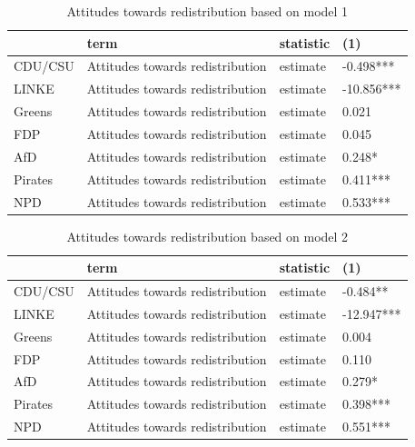 \documentclass[
]{article}
\begin{document}
\begin{table}

\caption{\label{tab:multinomial-model}Attitudes towards redistribution based on model 1}
\centering
\begin{tabu} to 
\toprule
  & term & statistic & (1)\\
\midrule
CDU/CSU & Attitudes towards redistribution & estimate & -0.498***\\
LINKE & Attitudes towards redistribution & estimate & -10.856***\\
Greens & Attitudes towards redistribution & estimate & 0.021\\
FDP & Attitudes towards redistribution & estimate & 0.045\\
AfD & Attitudes towards redistribution & estimate & 0.248*\\
\addlinespace
Pirates & Attitudes towards redistribution & estimate & 0.411***\\
NPD & Attitudes towards redistribution & estimate & 0.533***\\
\bottomrule
\end{tabu}
\end{table}
\begin{table}

\caption{\label{tab:multinomial-model}Attitudes towards redistribution based on model 2}
\centering
\begin{tabu} to 
\toprule
  & term & statistic & (1)\\
\midrule
CDU/CSU & Attitudes towards redistribution & estimate & -0.484**\\
LINKE & Attitudes towards redistribution & estimate & -12.947***\\
Greens & Attitudes towards redistribution & estimate & 0.004\\
FDP & Attitudes towards redistribution & estimate & 0.110\\
AfD & Attitudes towards redistribution & estimate & 0.279*\\
\addlinespace
Pirates & Attitudes towards redistribution & estimate & 0.398***\\
NPD & Attitudes towards redistribution & estimate & 0.551***\\
\bottomrule
\end{tabu}
\end{table}
\end{document}
